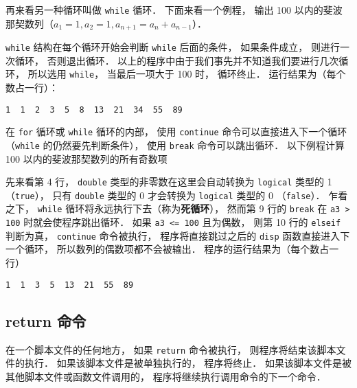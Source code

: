 再来看另一种循环叫做 \lstinline|while| 循环． 下面来看一个例程， 输出 100 以内的斐波那契数列（$a_1 = 1, a_2 = 1, a_{n+1} = a_{n} + a_{n-1}$）．


\lstinline|while| 结构在每个循环开始会判断 \lstinline|while| 后面的条件， 如果条件成立， 则进行一次循环， 否则退出循环． 以上的程序中由于我们事先并不知道我们要进行几次循环， 所以选用 \lstinline|while|， 当最后一项大于 100 时， 循环终止． 运行结果为（每个数占一行）：
\begin{lstlisting}[language=matlabC]
1  1  2  3  5  8  13  21  34  55  89
\end{lstlisting}

在 \lstinline|for| 循环或 \lstinline|while| 循环的内部， 使用 \lstinline|continue| 命令可以直接进入下一个循环（\lstinline|while| 的仍然要先判断条件）， 使用 \lstinline|break| 命令可以跳出循环． 以下例程计算 100 以内的斐波那契数列的所有奇数项


先来看第 4 行， \lstinline|double| 类型的非零数在这里会自动转换为 \lstinline|logical| 类型的 1 （\lstinline|true|）， 只有 \lstinline|double| 类型的 0 才会转换为 \lstinline|logical| 类型的 0 （\lstinline|false|）． 乍看之下， \lstinline|while| 循环将永远执行下去（称为\textbf{死循环}）， 然而第 9 行的 \lstinline|break| 在 \lstinline|a3 > 100| 时就会使程序跳出循环． 如果 \lstinline|a3 <= 100| 且为偶数， 则第 10 行的 \lstinline|elseif| 判断为真， \lstinline|continue| 命令被执行， 程序将直接跳过之后的 \lstinline|disp| 函数直接进入下一个循环， 所以数列的偶数项都不会被输出． 程序的运行结果为（每个数占一行）
\begin{lstlisting}[language=matlabC]
1  1  3  5  13  21  55  89
\end{lstlisting}

\subsection{return 命令}
在一个脚本文件的任何地方， 如果 \lstinline|return| 命令被执行， 则程序将结束该脚本文件的执行． 如果该脚本文件是被单独执行的， 程序将终止． 如果该脚本文件是被其他脚本文件或函数文件调用的， 程序将继续执行调用命令的下一个命令．



